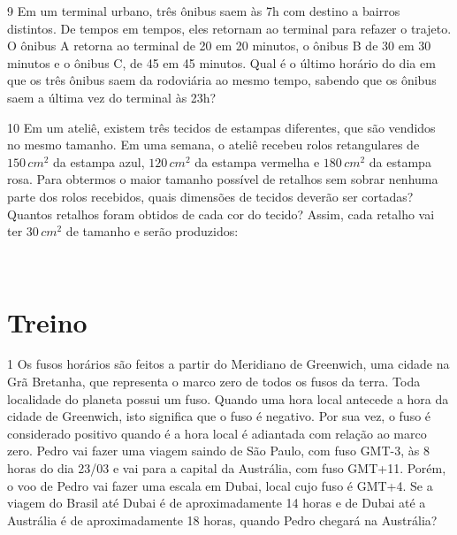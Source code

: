 \num{9} Em um terminal urbano, três ônibus saem às 7h com destino a bairros
distintos. De tempos em tempos, eles retornam ao terminal para refazer o
trajeto. O ônibus A retorna ao terminal de 20 em 20 minutos, o ônibus B
de 30 em 30 minutos e o ônibus C, de 45 em 45 minutos. Qual é o último
horário do dia em que os três ônibus saem da rodoviária ao mesmo tempo,
sabendo que os ônibus saem a última vez do terminal às 23h?



\num{10} Em um ateliê, existem três tecidos de estampas
diferentes, que são vendidos no mesmo tamanho. Em uma semana, o ateliê
recebeu rolos retangulares de $150\,cm^2$ da estampa azul, $120\,cm^2$ da
estampa vermelha e $180\,cm^2$ da estampa rosa. Para obtermos o maior
tamanho possível de retalhos sem sobrar nenhuma parte dos rolos
recebidos, quais dimensões de tecidos deverão ser cortadas? Quantos
retalhos foram obtidos de cada cor do tecido?
Assim, cada retalho vai ter $30\,cm^2$ de tamanho e serão produzidos:

\\

\section*{Treino}

\num{1} Os fusos horários são feitos a partir do Meridiano de Greenwich, uma
 cidade na Grã Bretanha, que representa o marco zero de todos os fusos da
 terra. Toda localidade do planeta possui um fuso. Quando uma hora local
 antecede a hora da cidade de Greenwich, isto significa que o fuso é
 negativo. Por sua vez, o fuso é considerado positivo quando é a hora local é
 adiantada com relação ao marco zero. Pedro vai fazer uma viagem saindo de
 São Paulo, com fuso GMT-3, às 8 horas do dia 23/03 e vai para a capital da
 Austrália, com fuso GMT+11. Porém, o voo de Pedro vai fazer uma escala em
 Dubai, local cujo fuso é GMT+4. Se a viagem do Brasil até Dubai é de
 aproximadamente 14 horas e de Dubai até a Austrália é de aproximadamente 18
 horas, quando Pedro chegará na Austrália?

